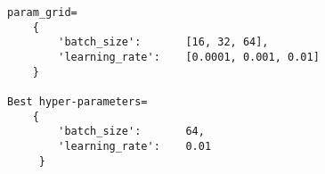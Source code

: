 \begin{lstlisting}
param_grid=
    {
        'batch_size':       [16, 32, 64],
        'learning_rate':    [0.0001, 0.001, 0.01]
    }

Best hyper-parameters=
    {
        'batch_size':       64, 
        'learning_rate':    0.01
     }
\end{lstlisting}
